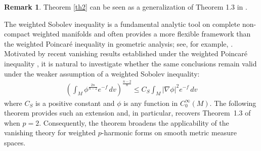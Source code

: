 \documentclass[leqno,12pt]{article} %
\theoremstyle{plain} %
\theoremstyle{definition} %
\newtheorem{remark}[theorem]{\indent\sc Remark}
\numberwithin{equation}{section}
\begin{document}
\begin{remark}
	Theorem \ref{th2} can be seen as a generalization of Theorem 1.3 in \cite{DDH25}.
\end{remark}
The weighted Sobolev inequality is a fundamental analytic tool on complete non-compact weighted manifolds and often provides a more flexible framework than the weighted Poincar\'e inequality in geometric analysis; see, for example, \cite{Hebey99,SaloffCoste02}. Motivated by recent vanishing results established under the weighted Poincar\'e inequality \cite{DS19,DDH25}, it is natural to investigate whether the same conclusions remain valid under the weaker assumption of a weighted Sobolev inequality:
\begin{align}\label{Sob}
	\left(
	\int_M \phi^{\frac{2n}{n-2}} e^{-f}\,dv
	\right)^{\frac{n-2}{n}}
	\le
	C_S \int_M |\nabla \phi|^2 e^{-f}\,dv
\end{align} 
where $C_S$ is a positive constant and $\phi$ is any function in $C^{\infty}_0(M)$. The following theorem provides such an extension and, in particular, recovers Theorem~1.3 of \cite{DDH25} when $p=2$. Consequently, the theorem broadens the applicability of the vanishing theory for weighted $p$-harmonic forms on smooth metric measure spaces.
\end{document}
